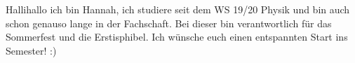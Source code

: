 \begin{multicols}{2}
{
Hallihallo ich bin Hannah, ich studiere seit dem WS 19/20 Physik und bin auch schon genauso lange in der Fachschaft. 
Bei dieser bin verantwortlich für das Sommerfest und die Erstisphibel. Ich wünsche euch einen entspannten Start ins Semester! :)
}

\vspace{0.3cm}


\end{multicols}
